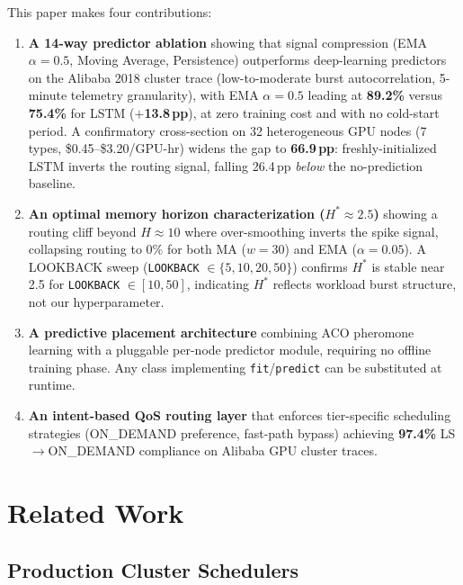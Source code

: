 \documentclass[conference]{IEEEtran}
\begin{document}
This paper makes four contributions:
\begin{enumerate}
\item \textbf{A 14-way predictor ablation} showing that signal compression
      (EMA $\alpha{=}0.5$, Moving Average, Persistence) outperforms
      deep-learning predictors on the Alibaba 2018 cluster trace
      (low-to-moderate burst autocorrelation, 5-minute telemetry
      granularity), with EMA $\alpha{=}0.5$ leading at \textbf{89.2\%}
      versus \textbf{75.4\%} for LSTM ($+$\textbf{13.8\,pp}), at zero
      training cost and with no cold-start period. A confirmatory
      cross-section on 32 heterogeneous GPU nodes (7 types,
      \$0.45--\$3.20/GPU-hr) widens the gap to \textbf{66.9\,pp}:
      freshly-initialized LSTM inverts the routing signal, falling
      26.4\,pp \emph{below} the no-prediction baseline.
\item \textbf{An optimal memory horizon characterization
      ($H^{*}{\approx}2.5$)} showing a routing cliff beyond $H{\approx}10$
      where over-smoothing inverts the spike signal, collapsing routing to
      0\% for both MA ($w{=}30$) and EMA ($\alpha{=}0.05$). A LOOKBACK
      sweep (\texttt{LOOKBACK} $\in \{5,10,20,50\}$) confirms $H^*$ is
      stable near 2.5 for \texttt{LOOKBACK} $\in [10,50]$, indicating
      $H^*$ reflects workload burst structure, not our hyperparameter.
\item \textbf{A predictive placement architecture} combining ACO pheromone
      learning with a pluggable per-node predictor module, requiring no
      offline training phase. Any class implementing
      \texttt{fit}/\texttt{predict} can be substituted at runtime.
\item \textbf{An intent-based QoS routing layer} that enforces tier-specific
      scheduling strategies (ON\_DEMAND preference, fast-path bypass)
      achieving \textbf{97.4\%} LS$\to$ON\_DEMAND compliance on Alibaba
      GPU cluster traces.
\end{enumerate}


\section{Related Work}

\subsection{Production Cluster Schedulers}
\end{document}
